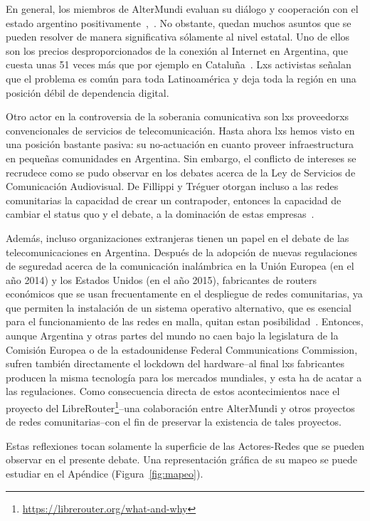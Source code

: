 En general, los miembros de AlterMundi evaluan su diálogo y cooperación con el estado argentino positivamente~\autocite{Vaseva2016a},~\autocite{Piccoli2015}.
No obstante, quedan muchos asuntos que se pueden resolver de manera significativa sólamente al nivel estatal.
Uno de ellos son los precios desproporcionados de la conexión al Internet en Argentina, que cuesta unas 51 veces más que por ejemplo en Cataluña~\autocite{Piccoli2015}.
Lxs activistas señalan que el problema es común para toda Latinoamérica y deja toda la región en una posición débil de dependencia digital.

Otro actor en la controversia de la soberania comunicativa son lxs proveedorxs convencionales de servicios de telecomunicación.
Hasta ahora lxs hemos visto en una posición bastante pasiva: su no-actuación en cuanto proveer infraestructura en pequeñas comunidades en Argentina.
Sin embargo, el conflicto de intereses se recrudece como se pudo observar en los debates acerca de la Ley de Servicios de Comunicación Audiovisual.
De Fillippi y Tréguer otorgan incluso a las redes comunitarias la capacidad de crear un contrapoder, entonces la capacidad de cambiar el status quo y el debate, a la dominación de estas empresas~\autocite{FiTre2015}.

Además, incluso organizaciones extranjeras tienen un papel en el debate de las telecomunicaciones en Argentina.
Después de la adopción de nuevas regulaciones de seguredad acerca de la comunicación inalámbrica en la Unión Europea (en el año 2014) y los Estados Unidos (en el año 2015), fabricantes de routers económicos que se usan frecuentamente en el despliegue de redes comunitarias, ya que permiten la instalación de un sistema operativo alternativo, que es esencial para el funcionamiento de las redes en malla, quitan estan posibilidad~\autocite{Wunderlich2017}.
Entonces, aunque Argentina y otras partes del mundo no caen bajo la legislatura de la Comisión Europea o de la estadounidense Federal Communications Commission, sufren también directamente el lockdown del hardware--al final lxs fabricantes producen la misma tecnología para los mercados mundiales, y esta ha de acatar a las regulaciones.
Como consecuencia directa de estos acontecimientos nace el proyecto del LibreRouter\footnote{\url{https://librerouter.org/what-and-why}}--una colaboración entre AlterMundi y otros proyectos de redes comunitarias--con el fin de preservar la existencia de tales proyectos.

Estas reflexiones tocan solamente la superficie de las Actores-Redes que se pueden observar en el presente debate.
Una representación gráfica de su mapeo se puede estudiar en el Apéndice (Figura~\vref{fig:mapeo}).

